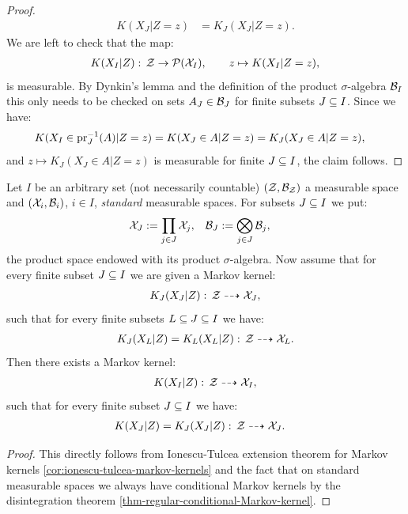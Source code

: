 \begin{Cor}
\begin{proof}
    \begin{align*}
        K(X_J|Z=z) &= K_J(X_J|Z=z).
    \end{align*}
    We are left to check that the map:
    \begin{align*}
        K(X_I|Z):\, \mathcal{Z} \to \mathcal{P}(\mathcal{X}_I), \qquad z \mapsto K(X_I|Z=z),
    \end{align*}
    is measurable. By Dynkin's lemma and the definition of the product $\sigma$-algebra $\mathcal{B}_I$ this only needs to be checked on sets 
    $A_J \in \mathcal{B}_J$ for finite subsets $J \subseteq I$. Since we have:
    \begin{align*}
        K(X_I \in \mathrm{pr}_{J}^{-1}(A)|Z=z) &= K(X_J \in A|Z=z) = K_J(X_J \in A|Z=z),
    \end{align*}
    and $z \mapsto K_J(X_J \in A|Z=z)$ is measurable for finite $J \subseteq I$, the claim follows.
\end{proof}
\end{Cor}


\begin{Cor}
    \label{cor:kolmogorov}
    Let $I$ be an arbitrary set (not necessarily countable) $(\mathcal{Z},\mathcal{B}_{\mathcal{Z}})$ a measurable space and $(\mathcal{X}_i,\mathcal{B}_i)$, $i \in I$, 
    \emph{standard} measurable spaces.
    For subsets $J \subseteq I$ we put:
    \begin{align}
        \mathcal{X}_J &:= \prod_{j \in J} \mathcal{X}_j, & \mathcal{B}_J&:= \bigotimes_{j \in J} \mathcal{B}_j,
    \end{align}
    the product space endowed with its product $\sigma$-algebra.
    Now assume that for every finite subset $J \subseteq I$  we are given a Markov kernel:
    \begin{align*}
        K_J(X_J|Z):\, \mathcal{Z} \dashrightarrow \mathcal{X}_J,
    \end{align*}
     such that for every finite subsets $L \subseteq J \subseteq I$ we have:
          \begin{align*}
              K_J(X_L|Z) = K_L(X_L|Z):\, \mathcal{Z} \dashrightarrow \mathcal{X}_L.
          \end{align*}
    Then there exists a Markov kernel:
    \begin{align*}
        K(X_I|Z):\, \mathcal{Z} \dashrightarrow \mathcal{X}_I,
    \end{align*}
    such that for every finite subset $J \subseteq I$ we have:
    \begin{align*}
        K(X_J|Z) &= K_J(X_J|Z):\, \mathcal{Z} \dashrightarrow \mathcal{X}_J.
    \end{align*}
\begin{proof}
    This directly follows from Ionescu-Tulcea extension theorem for Markov kernels \ref{cor:ionescu-tulcea-markov-kernels} and the fact that on standard measurable spaces we always have conditional Markov kernels by the disintegration theorem \ref{thm-regular-conditional-Markov-kernel}.
\end{proof}
\end{Cor}

